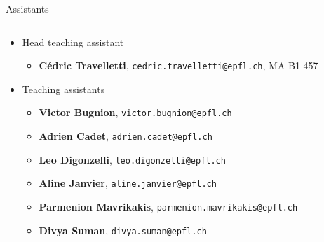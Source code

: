 \begin{frame}{Assistants}
    \begin{columns}
    \begin{column}{1.1\textwidth}
    \begin{itemize}
        \item Head teaching assistant
            \begin{itemize}
                \item \textbf{Cédric Travelletti}, \texttt{cedric.travelletti@epfl.ch}, MA B1 457
            \end{itemize}
            \vspace{1.5em}
        \item Teaching assistants
            \begin{itemize}
                \vspace{0.1em}
                \item \textbf{Victor Bugnion}, \texttt{victor.bugnion@epfl.ch}
                \vspace{0.1em}
                \item \textbf{Adrien Cadet}, \texttt{adrien.cadet@epfl.ch}
                \vspace{0.1em}
                \item \textbf{Leo Digonzelli}, \texttt{leo.digonzelli@epfl.ch}
                \vspace{0.1em}
                \item \textbf{Aline Janvier}, \texttt{aline.janvier@epfl.ch}
                \vspace{0.1em}
                \item \textbf{Parmenion Mavrikakis}, \texttt{parmenion.mavrikakis@epfl.ch}
                \vspace{0.1em}
                \item \textbf{Divya Suman}, \texttt{divya.suman@epfl.ch}
            \end{itemize}
    \end{itemize}
    \end{column}
    \end{columns}
\end{frame}

